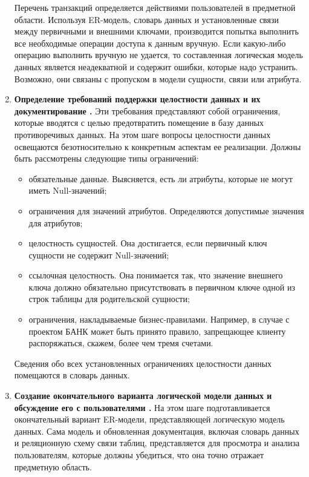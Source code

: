 \begin{enumerate}
        Перечень транзакций определяется действиями пользователей в предметной области. Используя ER-модель,
        словарь данных и установленные связи между первичными и внешними ключами, производится попытка выполнить
        все необходимые операции доступа к данным вручную. Если какую-либо операцию выполнить вручную не удается,
        то составленная логическая модель данных является неадекватной и содержит ошибки, которые надо устранить.
        Возможно, они связаны с пропуском в модели сущности, связи или атрибута.

    \item \textbf{Определение требований поддержки целостности данных и их документирование \autocite{design-db_6}.}
        Эти требования представляют собой ограничения, которые вводятся с целью предотвратить помещение в базу
        данных противоречивых данных. На этом шаге вопросы целостности данных освещаются безотносительно к
        конкретным аспектам ее реализации. Должны быть рассмотрены следующие типы ограничений:
        \begin{itemize}
            \item обязательные данные. Выясняется, есть ли атрибуты, которые не могут иметь Null-значений;

            \item ограничения для значений атрибутов. Определяются допустимые значения для атрибутов;

            \item целостность сущностей. Она достигается, если первичный ключ сущности не содержит Null-значений;

            \item ссылочная целостность. Она понимается так, что значение внешнего ключа должно обязательно
            присутствовать в первичном ключе одной из строк таблицы для родительской сущности;

            \item ограничения, накладываемые бизнес-правилами. Например, в случае с проектом БАНК может быть
            принято правило, запрещающее клиенту распоряжаться, скажем, более чем тремя счетами.
        \end{itemize}

    Сведения обо всех установленных ограничениях целостности данных помещаются в словарь данных.

    \item \textbf{Создание окончательного варианта логической модели данных и обсуждение его с пользователями \autocite{design-db_6}.}
        На этом шаге подготавливается окончательный вариант ER-модели, представляющей логическую модель данных.
        Сама модель и обновленная документация, включая словарь данных и реляционную схему связи таблиц,
        представляется для просмотра и анализа пользователям, которые должны убедиться, что она точно
        отражает предметную область.
\end{enumerate}


